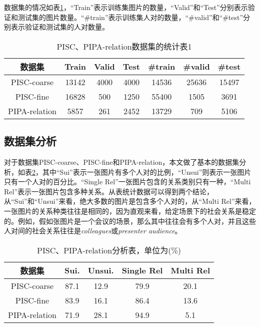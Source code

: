 数据集的情况如表\ref{tab:exp-sta-one}，``Train''表示训练集图片的数量，``Valid''和``Test''分别表示验证和测试集的图片数量。``\#train''表示训练集人对的数量，``\#valid''和``\#test''分别表示验证和测试集的人对数量。
\begin{table}[htpb]
  \centering
  \caption{PISC、PIPA-relation数据集的统计表1}
  \label{tab:exp-sta-one}
  \setlength{\tabcolsep}{4.5mm}
  \begin{tabular}{c|c|c|c|c|c|c}
    \toprule
    数据集 & Train & Valid & Test & \#train  &  \#valid &  \#test  \\
    \midrule
    PISC-coarse & 13142 & 4000 & 4000 & 14536 & 25636 & 15497   \\
    \midrule
    PISC-fine &  16828 & 500 & 1250 & 55400 & 1505 & 3691 \\
    \midrule
    PIPA-relation & 5857 & 261 & 2452 & 13729 & 709 & 5106 \\
    \bottomrule
  \end{tabular}
\end{table}

\subsection{数据集分析} \label{sec:exp-dataset-ana}

对于数据集PISC-coarse、PISC-fine和PIPA-relation，本文做了基本的数据集分析，如表\ref{tab:exp-sta-two}，其中``Sui''表示一张图片有多个人对的比例，``Unsui''则表示一张图片只有一个人对的百分比。``Single Rel''一张图片包含的关系类别只有一种，``Multi Rel''表示一张图片包含多种关系。从表统计数据可以得到两个结论，从``Sui''和``Unsui''来看，绝大多数的图片是包含多个人对的，从``Multi Rel''来看，一张图片的关系种类往往是相同的，因为直观来看，给定场景下的社会关系是稳定的。例如，假如张图片是一个会议的场景，那么其中往往会有多个人对，并且这些人对间的社会关系往往是{\it colleagues}或{\it presenter audience}。
\begin{table}[htpb]
  \centering
  \caption{PISC、PIPA-relation分析表，单位为(\%)}
  \label{tab:exp-sta-two}
  \begin{tabular}{c|c|c|c|c}
    \toprule
    数据集 & Sui. & Unsui. & Single Rel & Multi Rel \\
    \midrule
    PISC-coarse  & 87.1 & 12.9 & 79.9 & 20.1 \\
    \midrule
    PISC-fine  & 83.9 & 16.1 & 86.4 & 13.6 \\
    \midrule
    PIPA-relation & 71.9 & 28.1 & 94.9 & 5.1 \\
    \bottomrule
  \end{tabular}
\end{table}

